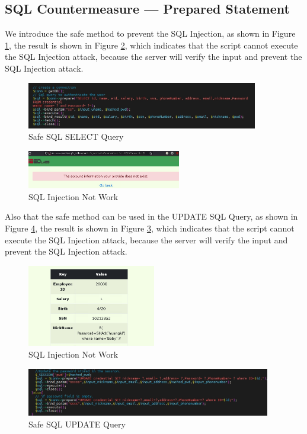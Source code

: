 \documentclass[a4paper,11pt]{article}
\begin{document}
\subsection{SQL Countermeasure — Prepared Statement}
We introduce the safe method to prevent the SQL Injection, as shown in Figure \ref{fig:task16.1}, the result is shown in Figure \ref{fig:task16.2}, which indicates that the script cannot execute the SQL Injection attack, because the server will verify the input and prevent the SQL Injection attack.
\begin{figure}[h]
    \centering
       \includegraphics[width=0.9\textwidth]{figures/task16/task16.1.png}
    \caption{Safe SQL SELECT Query}\label{fig:task16.1}
\end{figure}

\begin{figure}[h]
    \centering
       \includegraphics[width=0.6\textwidth]{figures/task16/task16.2.png}
    \caption{SQL Injection Not Work}\label{fig:task16.2}
\end{figure}

Also that the safe method can be used in the UPDATE SQL Query, as shown in Figure \ref{fig:task16.4}, the result is shown in Figure \ref{fig:task16.3}, which indicates that the script cannot execute the SQL Injection attack, because the server will verify the input and prevent the SQL Injection attack.
\begin{figure}[h]
    \centering
       \includegraphics[width=0.5\textwidth]{figures/task16/task16.3.png}
    \caption{SQL Injection Not Work}\label{fig:task16.3}
\end{figure}
\begin{figure}[h!]
    \centering
       \includegraphics[width=0.95\textwidth]{figures/task16/task16.4.png}
    \caption{Safe SQL UPDATE Query}\label{fig:task16.4}
\end{figure}

%
\end{document}
